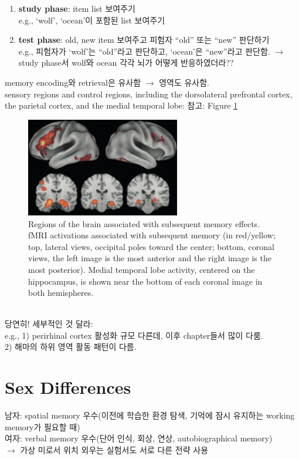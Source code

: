 \documentclass[../note.tex]{subfiles}
\begin{document}
\begin{itemize}
\begin{enumerate}
  \item \textbf{study phase}: item list 보여주기\\
    e.g., `wolf', `ocean'이 포함된 list 보여주기
  \item \textbf{test phase}: old, new item 보여주고 피험자 ``old'' 또는 ``new'' 판단하기\\
    e.g., 피험자가 `wolf'는 ``old''라고 판단하고, `ocean'은 ``new''라고 판단함.
    $\longrightarrow$ study phase서 wolf와 ocean 각각 뇌가 어떻게 반응하였더라??
\end{enumerate}

memory encoding와 retrieval은 유사함 $\rightarrow$ 영역도 유사함.\\
sensory regions and control regions, including the dorsolateral prefrontal
cortex, the parietal cortex, and the medial temporal lobe: 참고: Figure \ref{fig:encoding_region}

\begin{figure}[htbp]
  \centering
  \includegraphics[width=0.6\textwidth]{image/encoding_region}
  \caption{Regions of the brain associated with subsequent memory effects. fMRI
    activations associated with subsequent memory (in red/yellow; top, lateral views, occipital
    poles toward the center; bottom, coronal views, the left image is the most anterior and the
    right image is the most posterior). Medial temporal lobe activity, centered on the
    hippocampus, is shown near the bottom of each coronal image in both hemispheres.}
  \label{fig:encoding_region}
\end{figure}\\

당연히! 세부적인 것 달라:\\
e.g., 1) perirhinal cortex 활성화 규모 다른데, 이후 chapter들서 많이 다룸.\\
2) 해마의 하위 영역 활동 패턴이 다름.

\section{Sex Differences}
남자: spatial memory 우수(이전에 학습한 환경 탐색, 기억에 잠시 유지하는 working memory가 필요할 때)\\
여자: verbal memory 우수(단어 인식, 회상, 연상, autobiographical memory)\\
$\rightarrow$ 가상 미로서 위치 외우는 실험서도 서로 다른 전략 사용\\


\end{itemize}
\end{document}
